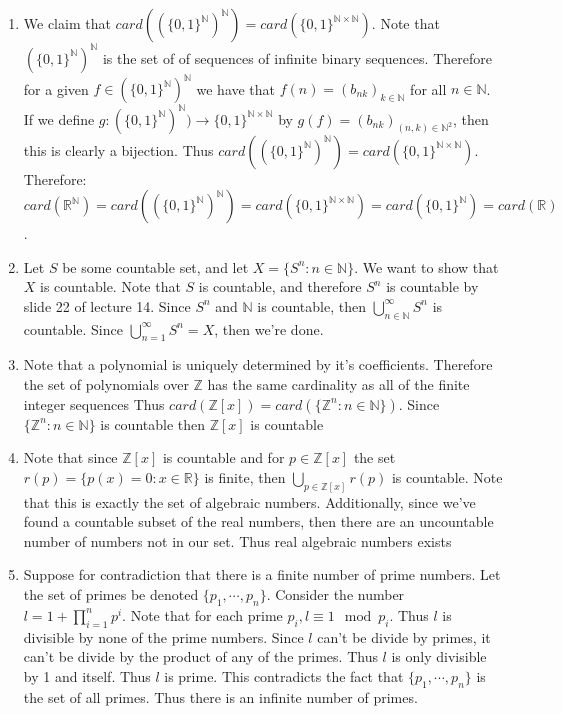 \documentclass[12pt, letterpaper]{article}
\newcommand{\Z}{\mathbb{Z}}
\newcommand{\N}{\mathbb{N}}
\newcommand{\R}{\mathbb{R}}
\begin{document}
\begin{enumerate}
	\begin{enumerate}
		\item We claim that $card((\{0,1\}^\N)^\N) = card(\{0,1\}^{\N\times \N})$.
		Note that $(\{0,1\}^\N)^\N$ is the set of of sequences of infinite binary sequences.  Therefore for a given $f \in (\{0,1\}^\N)^\N$ we have that $f(n) = (b_{nk})_{ k\in \N}$ for all $n \in \N$.  If we define $g:(\{0,1\}^\N)^\N) \to \{0,1\}^{\N\times \N}$ by $g(f) = (b_{nk})_{(n,k) \in \N^2}$, then this is clearly a bijection.  Thus $card((\{0,1\}^\N)^\N) = card(\{0,1\}^{\N\times \N})$.
		Therefore: $$card(\R^\N) = card((\{0,1\}^\N)^\N) = card(\{0,1\}^{\N\times \N}) = card(\{0,1\}^{\N}) = card(\R)$$.    
		\item Let $S$ be some countable set, and let $X = \{S^n : n \in \N\}$.  We want to show that $X$ is countable.  
		Note that $S$ is countable, and therefore $S^n$ is countable by slide 22 of lecture 14.  Since $S^n$ and $\N$ is countable, then $\bigcup_{n \in \N}^\infty S^n$ is countable.  Since $\bigcup_{n=1}^\infty S^n = X$, then we're done.  
		\item Note that a polynomial is uniquely determined by it's coefficients.
		Therefore the set of polynomials over $\Z$ has the same cardinality as all of the finite integer sequences  Thus $card(\Z[x]) = card(\{\Z^n: n \in \N\}).$  
		Since $\{\Z^n: n \in \N\}$ is countable then $\Z[x]$ is countable
		\item Note that since $\Z[x]$ is countable and for $p \in \Z[x]$ the set
		$r(p) = \{p(x) = 0 : x \in \R \}$ is finite, then $\bigcup_{p \in \Z[x]} r(p)$ is countable.  Note that this is exactly the set of algebraic numbers.  Additionally, since we've found a countable subset of the real numbers, then 
		there are an uncountable number of numbers not in our set.  Thus real algebraic numbers exists \\ 
		\item Suppose for contradiction that there is a finite number of prime numbers.  Let the set of primes be denoted
		$\{p_1,\cdots,p_n\}$.  Consider the number $l = 1 + \prod_{i=1}^n p^i$.  Note that for each prime $p_i, l \equiv 1 \mod{p_i}$.  Thus $l$ is divisible by none of the prime numbers.  Since $l$ can't be divide by primes, it can't be divide by the product of any of the primes.  Thus $l$ is only divisible by 1 and itself.  Thus $l$ is prime.  This contradicts the fact that  $\{p_1,\cdots,p_n\}$ is the set of all primes.  Thus there is an infinite number of primes.
	\end{enumerate}
\end{enumerate}
\end{document}
